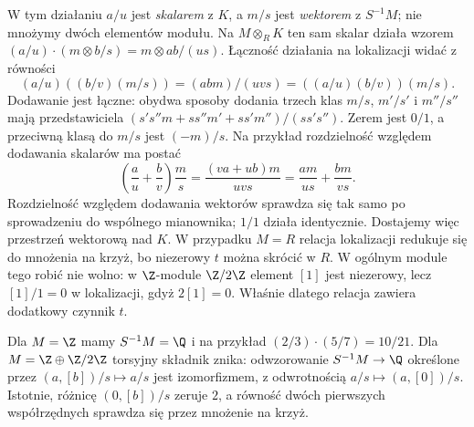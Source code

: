 W tym działaniu $a/u$ jest \emph{skalarem} z $K$, a $m/s$ jest
\emph{wektorem} z $S^{-1}M$; nie mnożymy dwóch elementów modułu.
Na $M\otimes_R K$ ten sam skalar działa wzorem
$(a/u)\cdot(m\otimes b/s)=m\otimes ab/(us)$.
Łączność działania na lokalizacji widać z równości
\[
 (a/u)((b/v)(m/s))=(abm)/(uvs)=((a/u)(b/v))(m/s).
\]
Dodawanie jest łączne: obydwa sposoby dodania trzech klas
$m/s$, $m'/s'$ i $m''/s''$ mają przedstawiciela
$(s's''m+ss''m'+ss'm'')/(ss's'')$.
Zerem jest $0/1$, a przeciwną klasą do $m/s$ jest $(-m)/s$.
Na przykład rozdzielność względem dodawania skalarów ma postać
\[
 \left(\frac au+\frac bv\right)\frac ms
 =\frac{(va+ub)m}{uvs}
 =\frac{am}{us}+\frac{bm}{vs}.
\]
Rozdzielność względem dodawania wektorów sprawdza się tak samo
po sprowadzeniu do wspólnego mianownika; $1/1$ działa
identycznie. Dostajemy więc przestrzeń wektorową nad $K$.
W przypadku $M=R$ relacja lokalizacji redukuje się do mnożenia
na krzyż, bo niezerowy $t$ można skrócić w $R$.
W ogólnym module tego robić nie wolno: w $\Z$-module $\Z/2\Z$
element $[1]$ jest niezerowy, lecz $[1]/1=0$ w lokalizacji,
gdyż $2[1]=0$. Właśnie dlatego relacja zawiera dodatkowy czynnik $t$.

\begin{przyklad}
Dla $M=\Z$ mamy $S^{-1}M=\Q$ i na przykład
$(2/3)\cdot(5/7)=10/21$.
Dla $M=\Z\oplus\Z/2\Z$ torsyjny składnik znika:
odwzorowanie $S^{-1}M\to\Q$ określone przez
$(a,[b])/s\mapsto a/s$
jest izomorfizmem, z odwrotnością $a/s\mapsto(a,[0])/s$.
Istotnie, różnicę $(0,[b])/s$ zeruje $2$, a równość dwóch
pierwszych współrzędnych sprawdza się przez mnożenie na krzyż.
\end{przyklad}

